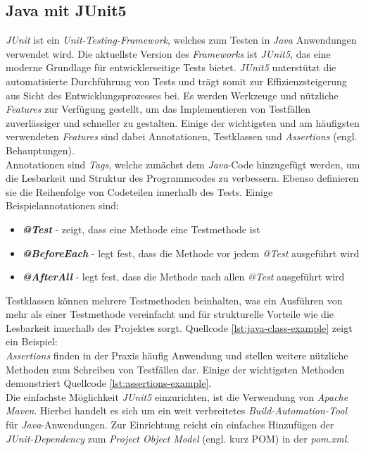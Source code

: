 \subsection{Java mit JUnit5}
\textit{JUnit} ist ein \textit{Unit-Testing-Framework}, welches zum Testen in \textit{Java} Anwendungen verwendet wird. Die aktuellste Version des \textit{Frameworks} ist \textit{JUnit5}, das eine moderne Grundlage für entwicklerseitige Tests bietet. \cite*{JUnit} \textit{JUnit5} unterstützt die automatisierte Durchführung von Tests und trägt somit zur Effizienzsteigerung aus Sicht des Entwicklungsprozesses bei. \cite*{venkatesanJunitFrameworkUnit} Es werden Werkzeuge und nützliche \textit{Features} zur Verfügung gestellt, um das Implementieren von Testfällen zuverlässiger und schneller zu gestalten. Einige der wichtigsten und am häufigsten verwendeten \textit{Features} sind dabei Annotationen, Testklassen und \textit{Assertions} (engl. Behauptungen). \cite*{venkatesanJunitFrameworkUnit}\\
Annotationen sind \textit{Tags}, welche zunächst dem \textit{Java}-Code hinzugefügt werden, um die Lesbarkeit und Struktur des Programmcodes zu verbessern. Ebenso definieren sie die Reihenfolge von Codeteilen innerhalb des Tests. Einige Beispielannotationen sind: \cite*{JUnitUserGuide}
\begin{itemize}
    \setlength{\parskip}{1pt}
    \item \textbf{\textit{@Test}} - zeigt, dass eine Methode eine Testmethode ist
    \item \textbf{\textit{@BeforeEach}} - legt fest, dass die Methode vor jedem \textit{@Test} ausgeführt wird
    \item \textbf{\textit{@AfterAll}} - legt fest, dass die Methode nach allen \textit{@Test} ausgeführt wird
\end{itemize}
Testklassen können mehrere Testmethoden beinhalten, was ein Ausführen von mehr als einer Testmethode vereinfacht und für strukturelle Vorteile wie die Lesbarkeit innerhalb des Projektes sorgt. Quellcode \ref{lst:java-class-example} zeigt ein Beispiel:\\
\vspace{-.3cm}
\textit{Assertions} finden in der Praxis häufig Anwendung und stellen weitere nützliche Methoden zum Schreiben von Testfällen dar. Einige der wichtigsten Methoden demonstriert Quellcode \ref{lst:assertions-example}.\\
\vspace{-.3cm}
Die einfachste Möglichkeit \textit{JUnit5} einzurichten, ist die Verwendung von \textit{Apache Maven}. Hierbei handelt es sich um ein weit verbreitetes \textit{Build-Automation-Tool} für \textit{Java}-Anwendungen. Zur Einrichtung reicht ein einfaches Hinzufügen der \textit{JUnit-Dependency} zum \textit{Project Object Model} (engl. kurz POM) in der \textit{pom.xml}. \cite*{baeldungGuideJUnitBaeldung2016}

